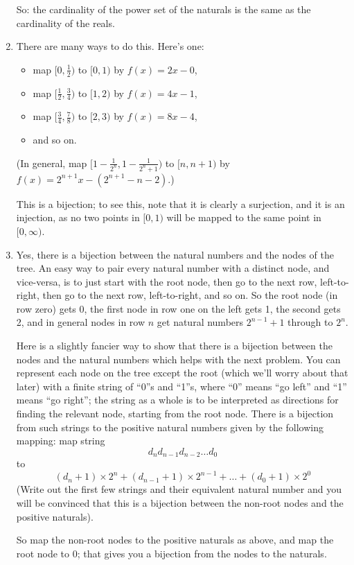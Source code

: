 \documentclass[12pt,a4paper]{article}
\begin{document}
\begin{enumerate}
So: the cardinality of the power set of the naturals is the same as the cardinality of the reals.

\item There are many ways to do this. Here's one: 
\begin{itemize}
\item map $[0, \frac{1}{2})$ to $[0,1)$ by $f(x)=2x-0$, 
\item map $[\frac{1}{2},\frac{3}{4})$ to $[1,2)$ by $f(x)=4x-1$, 
\item map $[\frac{3}{4},\frac{7}{8})$ to $[2,3)$ by $f(x)=8x-4$,
\item and so on.
\end{itemize}
(In general, map $[1-\frac{1}{2^n}, 1-\frac{1}{2^n+1})$ to $[n,n+1)$ by $f(x)=2^{n+1}x-(2^{n+1}-n-2)$.) 

This is a bijection; to see this, note that it is clearly a surjection, and it is an injection, as no two points in $[0,1)$ will be mapped to the same point in $[0,\infty)$.

\item Yes, there is a bijection between the natural numbers and the nodes of the tree. An easy way to pair every natural number with a distinct node, and vice-versa, is to just start with the root node, then go to the next row, left-to-right, then go to the next row, left-to-right, and so on. So the root node (in row zero) gets 0, the first node in row one on the left gets 1, the second gets 2, and in general nodes in row $n$ get natural numbers $2^{n-1} +1$ through to $2^n$.

Here is a slightly fancier way to show that there is a bijection between the nodes and the natural numbers which helps with the next problem. You can represent each node on the tree except the root (which we'll worry about that later) with a finite string of ``0''s and ``1''s, where ``0'' means ``go left'' and ``1'' means ``go right''; the string as a whole is to be interpreted as directions for finding the relevant node, starting from the root node. There is a bijection from such strings to the positive natural numbers given by the following mapping: map string $$d_nd_{n-1}d_{n-2}\ldots d_0$$ to $$(d_n+1)\times 2^n + (d_{n-1}+1)\times 2^{n-1} + \ldots + (d_0 +1)\times 2^0$$ (Write out the first few strings and their equivalent natural number and you will be convinced that this is a bijection between the non-root nodes and the positive naturals).

So map the non-root nodes to the positive naturals as above, and map the root node to 0; that gives you a bijection from the nodes to the naturals.


\end{enumerate}
\end{document}
